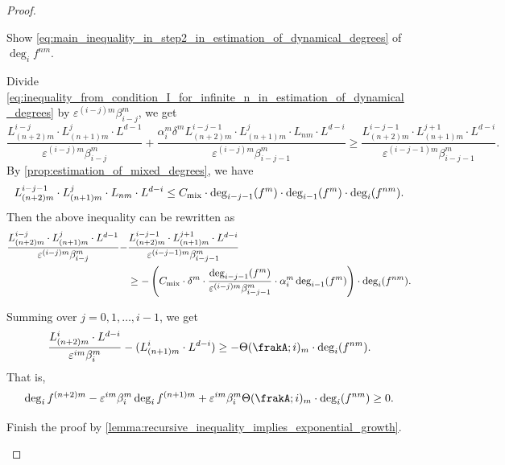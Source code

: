 \begin{proof}
    \begin{step}
      Show \cref{eq:main_inequality_in_step2_in_estimation_of_dynamical_degrees} of $\deg_i f^{nm}$.
    \end{step}

    Divide \cref{eq:inequality_from_condition_I_for_infinite_n_in_estimation_of_dynamical_degrees} by $\varepsilon^{(i-j)m} \beta_{i-j}^m$, we get
    \[
      \frac{L_{(n+2)m}^{i-j} \cdot L_{(n+1)m}^j \cdot L^{d-1}}{\varepsilon^{(i-j)m} \beta_{i-j}^m} + \frac{\alpha_{i}^m \delta^m L_{(n+2)m}^{i-j-1} \cdot L_{(n+1)m}^{j} \cdot L_{nm} \cdot L^{d-i}}{\varepsilon^{(i-j)m} \beta_{i-j-1}^m} \geq \frac{L_{(n+2)m}^{i-j-1} \cdot L_{(n+1)m}^{j+1} \cdot L^{d-i}}{\varepsilon^{(i-j-1)m} \beta_{i-j-1}^m}.
    \]
    By \cref{prop:estimation_of_mixed_degrees}, we have
    \[ L_{(n+2)m}^{i-j-1} \cdot L_{(n+1)m}^{j} \cdot L_{nm} \cdot L^{d-i} \leq C_{\text{mix}} \cdot \deg_{i-j-1}(f^{m}) \cdot \deg_{i-1}(f^{m}) \cdot \deg_i(f^{nm}). \]
    Then the above inequality can be rewritten as
    \begin{equation}\label{eq:inequality_in_estimation_of_dynamical_degrees_define_Theta}
      \begin{aligned}
        \frac{L_{(n+2)m}^{i-j} \cdot L_{(n+1)m}^j \cdot L^{d-1}}{\varepsilon^{(i-j)m} \beta_{i-j}^m} - &\frac{L_{(n+2)m}^{i-j-1} \cdot L_{(n+1)m}^{j+1} \cdot L^{d-i}}{\varepsilon^{(i-j-1)m} \beta_{i-j-1}^m} \\
        & \geq - \left( C_{\text{mix}} \cdot \delta^m \cdot \frac{\deg_{i-j-1}(f^{m}) }{\varepsilon^{(i-j)m} \beta_{i-j-1}^m} \cdot \alpha_i^m \deg_{i-1}(f^{m}) \right) \cdot \deg_i(f^{nm}).
      \end{aligned}
    \end{equation}

    Summing over $j = 0, 1, \ldots, i-1$, we get
    \[ \frac{L_{(n+2)m}^i \cdot L^{d-i}}{\varepsilon^{im} \beta_i^m} -  (L_{(n+1)m}^{i} \cdot L^{d-i}) \geq - \Theta(\frakA; i)_m \cdot \deg_i(f^{nm}). \]
    That is,
    \begin{equation}\label{eq:main_inequality_in_step2_in_estimation_of_dynamical_degrees}
      \deg_i f^{(n+2)m} - \varepsilon^{im} \beta_i^m \deg_i f^{(n+1)m} + \varepsilon^{im} \beta_i^m \Theta(\frakA; i)_m \cdot \deg_i(f^{nm}) \geq 0. 
    \end{equation}
    

    \begin{step}
      Finish the proof by \cref{lemma:recursive_inequality_implies_exponential_growth}.
    \end{step}


\end{proof}
